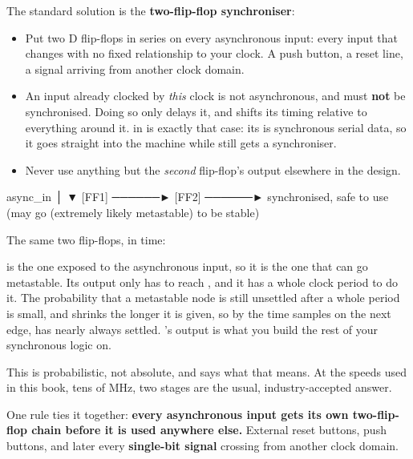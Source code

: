 The standard solution is the \textbf{two-flip-flop synchroniser}:
\begin{itemize}
  \item Put two D flip-flops in series on every asynchronous input: every input that changes with
    no fixed relationship to your clock. A push button, a reset line, a signal arriving from
    another clock domain.
  \item An input already clocked by \emph{this} clock is not asynchronous, and must \textbf{not} be
    synchronised. Doing so only delays it, and shifts its timing relative to everything around it.
     in  is exactly that case: its  is synchronous
    serial data, so it goes straight into the machine while  still gets a
    synchroniser.
  \item Never use anything but the \emph{second} flip-flop's output elsewhere in the design.
\end{itemize}

\begin{textdrawing}
async_in
   │
   ▼
 [FF1] ──────► [FF2] ──────► synchronised, safe to use
   (may go        (extremely likely
   metastable)     to be stable)
\end{textdrawing}

The same two flip-flops, in time:


 is the one exposed to the asynchronous input, so it is the one that can go metastable.
Its output only has to reach , and it has a whole clock period to do it. The probability
that a metastable node is still unsettled after a whole period is small, and shrinks the longer it
is given, so by the time  samples on the next edge,  has nearly always settled.
's output is what you build the rest of your synchronous logic on.

This is probabilistic, not absolute, and  says what that means. At the speeds
used in this book, tens of MHz, two stages are the usual, industry-accepted answer.

One rule ties it together: \textbf{every asynchronous input gets its own two-flip-flop chain before
it is used anywhere else.} External reset buttons, push buttons, and later every
\textbf{single-bit signal} crossing from another clock domain.

